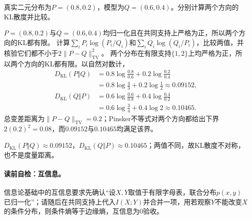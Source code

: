 \label{struct:V1-C06-CH20}
\begin{example}[二元分布的双向KL比较]\label{exm:V1-C06-kl-asymmetry}
真实二元分布为$P=(0.8,0.2)$，模型为$Q=(0.6,0.4)$。分别计算两个方向的KL散度并比较。
\end{example}
\begin{solution}
\SolGiven $P=(0.8,0.2)$与$Q=(0.6,0.4)$均归一化且在共同支持上严格为正，所以两个方向的KL都有限。
\SolPlan 计算$\sum_iP_i\log(P_i/Q_i)$和$\sum_iQ_i\log(Q_i/P_i)$，比较两值，并核验它们都不小于$2\|P-Q\|_{\mathrm{TV}}^2$。
\SolDerive
两个分布在有限支持$\{1,2\}$上均严格为正，所以两个方向的KL都有限。以自然对数计，
\[
\begin{aligned}
D_{\mathrm{KL}}(P\Vert Q)
&=0.8\log\frac{0.8}{0.6}+0.2\log\frac{0.2}{0.4}\\
&=0.8\log\frac43+0.2\log\frac12
\approx0.09152,\\
D_{\mathrm{KL}}(Q\Vert P)
&=0.6\log\frac{0.6}{0.8}+0.4\log\frac{0.4}{0.2}\\
&=0.6\log\frac34+0.4\log2
\approx0.10465.
\end{aligned}
\]
\SolCheck 总变差距离为$\lVert P-Q\rVert_{\mathrm{TV}}=0.2$；Pinsker不等式对两个方向都给出下界$2(0.2)^2=0.08$，而$0.09152$与$0.10465$均满足该界。

\SolAnswer $D_{\mathrm{KL}}(P\Vert Q)\approx0.09152$，$D_{\mathrm{KL}}(Q\Vert P)\approx0.10465$；两值不同，故KL散度不对称，也不是度量距离。
\end{solution}


\paragraph{读前自检：互信息。}信息论基础中的互信息要求先确认“设$X,Y$取值于有限字母表，联合分布$p(x,y)$已归一化”；请随后在共同支持上代入$I(X;Y)$并合并一项，用若观察$Y$不能改变$X$的条件分布，则条件熵等于边缘熵，互信息为0验收。\par

